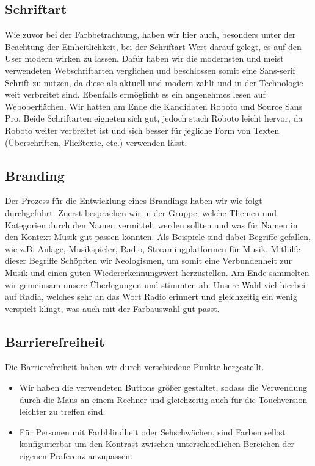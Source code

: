 \documentclass{article}
\begin{document}
\subsection{Schriftart}
Wie zuvor bei der Farbbetrachtung, haben wir hier auch, besonders unter der Beachtung der Einheitlichkeit, bei der Schriftart Wert darauf gelegt, es auf den User modern wirken zu lassen. Dafür haben wir die modernsten und meist verwendeten Webschriftarten verglichen und beschlossen somit eine Sans-serif Schrift zu nutzen, da diese als aktuell und modern zählt und in der Technologie weit verbreitet sind. Ebenfalls ermöglicht es ein angenehmes lesen auf Weboberflächen. Wir hatten am Ende die Kandidaten Roboto und Source Sans Pro. Beide Schriftarten eigneten sich gut, jedoch stach Roboto leicht hervor, da Roboto weiter verbreitet ist und sich besser für jegliche Form von Texten (Überschriften, Fließtexte, etc.) verwenden lässt.

\subsection{Branding}
Der Prozess für die Entwicklung eines Brandings haben wir wie folgt durchgeführt. Zuerst besprachen wir in der Gruppe, welche Themen und Kategorien durch den Namen vermittelt werden sollten und was für Namen in den Kontext Musik gut passen könnten. Als Beispiele sind dabei Begriffe gefallen, wie z.B. Anlage, Musikspieler, Radio, Streamingplatformen für Musik. Mithilfe dieser Begriffe Schöpften wir Neologismen, um somit eine Verbundenheit zur Musik und einen guten Wiedererkennungswert herzustellen. Am Ende sammelten wir gemeinsam unsere Überlegungen und stimmten ab. Unsere Wahl viel hierbei auf Radia, welches sehr an das Wort Radio erinnert und gleichzeitig ein wenig verspielt klingt, was auch mit der Farbauswahl gut passt.
\newpage
\subsection{Barrierefreiheit}
Die Barrierefreiheit haben wir durch verschiedene Punkte hergestellt. 
\begin{itemize}
    \item Wir haben die verwendeten Buttons größer gestaltet, sodass die Verwendung durch die Maus an einem Rechner und gleichzeitig auch für die Touchversion leichter zu treffen sind.
    \item Für Personen mit Farbblindheit oder Sehschwächen, sind Farben selbst konfigurierbar um den Kontrast zwischen unterschiedlichen Bereichen der eigenen Präferenz anzupassen.
\end{itemize}
\end{document}
